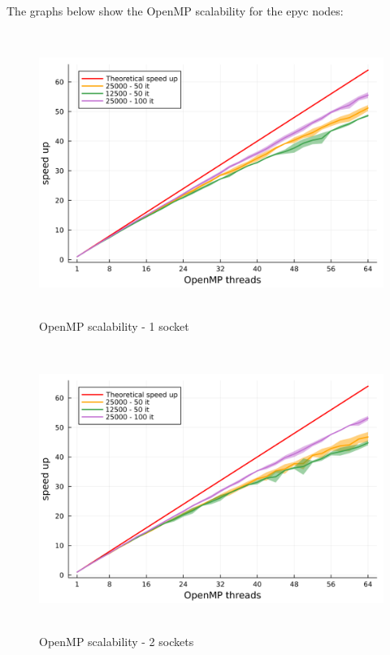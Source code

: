 \documentclass[
  letterpaper,
  DIV=11,
  numbers=noendperiod]{scrartcl}
\begin{document}
The graphs below show the OpenMP scalability for the epyc nodes:

\begin{figure}

{\centering \includegraphics[width=\textwidth,height=3.64583in]{img/epyc_1_socket.png}

}

\caption{OpenMP scalability - 1 socket}

\end{figure}

\begin{figure}

{\centering \includegraphics[width=\textwidth,height=3.64583in]{img/epyc_2_sockets.png}

}

\caption{OpenMP scalability - 2 sockets}

\end{figure}
\end{document}
